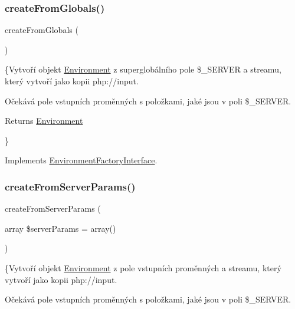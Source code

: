 \subsubsection{\texorpdfstring{create\+From\+Globals()}{createFromGlobals()}}
{\footnotesize\ttfamily create\+From\+Globals (\begin{DoxyParamCaption}{ }\end{DoxyParamCaption})}

\{Vytvoří objekt \mbox{\hyperlink{class_pes_1_1_http_1_1_environment}{Environment}} z superglobálního pole \$\+\_\+\+S\+E\+R\+V\+ER a streamu, který vytvoří jako kopii php\+://input.

Očekává pole vstupních proměnných s položkami, jaké jsou v poli \$\+\_\+\+S\+E\+R\+V\+ER.

\begin{DoxyReturn}{Returns}
\mbox{\hyperlink{class_pes_1_1_http_1_1_environment}{Environment}}
\end{DoxyReturn}
\} 

Implements \mbox{\hyperlink{interface_pes_1_1_http_1_1_factory_1_1_environment_factory_interface_a0c9fd6ecd2d19d53bdbaa89c08428564}{Environment\+Factory\+Interface}}.

\mbox{\label{class_pes_1_1_http_1_1_factory_1_1_environment_factory_aaf064f4cfd8fa6ba2e87755aa7f03b26}} 
\subsubsection{\texorpdfstring{create\+From\+Server\+Params()}{createFromServerParams()}}
{\footnotesize\ttfamily create\+From\+Server\+Params (\begin{DoxyParamCaption}\item[{array}]{\$server\+Params = {\ttfamily array()} }\end{DoxyParamCaption})}

\{Vytvoří objekt \mbox{\hyperlink{class_pes_1_1_http_1_1_environment}{Environment}} z pole vstupních proměnných a streamu, který vytvoří jako kopii php\+://input.

Očekává pole vstupních proměnných s položkami, jaké jsou v poli \$\+\_\+\+S\+E\+R\+V\+ER.


